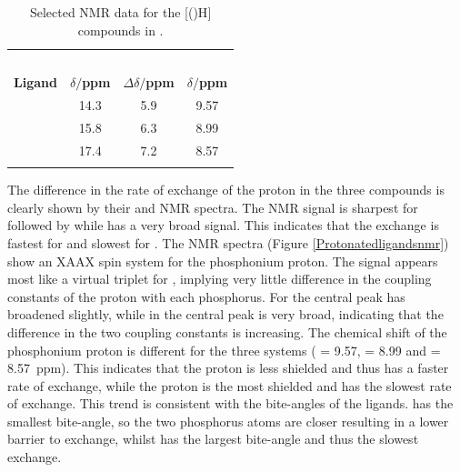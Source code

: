 \begin{table}[htbp]
\caption[Selected NMR data for [(\tBuxantphos)H{]}]{Selected NMR data for the [(\tBuxantphos)H{]} compounds in .}
\label{table:protonatedNMR}
\small
\begin{center}
\begin{tabular}{l c c c}
	\toprule{}
	~~ & \multicolumn{2}{c}{\bfseries{\phosphorus}} & \bfseries{\proton}\\
	\cmidrule(lr){2-3} \cmidrule(lr){4-4}
	\bfseries{Ligand}&\bfseries{$\delta/$ppm}&\bfseries{$\Delta\delta/$ppm}& \bfseries{\ce{H+}$\delta/$ppm}\\
	\midrule
	\tBuSixantphos		& 14.3	& 5.9 	& 9.57 \\
	\tBuThixantphos 	& 15.8	& 6.3		& 8.99 \\
	\tBuXantphos		& 17.4	& 7.2		& 8.57 \\
	\bottomrule{}
\end{tabular}
\end{center}
\end{table}

The difference in the rate of exchange of the proton in the three compounds is clearly shown by their \phosphorus{} and \proton{} NMR spectra.  The \phosphorus{} NMR signal is sharpest for \tBusixantphos{} followed by \tButhixantphos{} while \tBuxantphos{} has a very broad signal.  This indicates that the exchange is fastest for \tBusixantphos{} and slowest for \tBuxantphos{}.  The \proton{} NMR spectra (Figure \ref{Protonatedligandsnmr}) show an XAA\textprime{}X\textprime{} spin system for the phosphonium proton.  The signal appears most like a virtual triplet for \tBusixantphos{}, implying very little difference in the coupling constants of the proton with each phosphorus.  For \tButhixantphos{} the central peak has broadened slightly, while in \tBuxantphos{} the central peak is very broad, indicating that the difference in the two coupling constants is increasing.  The chemical shift of the phosphonium proton is different  for the three systems (\tBusixantphos{} = 9.57, \tButhixantphos{} = 8.99 and \tBuxantphos{} = 8.57~ppm).  This indicates that the \tBusixantphos{} proton is less shielded and thus has a faster rate of exchange, while the \tBuxantphos{} proton is the most shielded and has the slowest rate of exchange.  This trend is consistent with the bite-angles of the ligands.  \tBuSixantphos{} has the smallest bite-angle, so the two phosphorus atoms are closer resulting in a lower barrier to exchange, whilst \tBuxantphos{} has the largest bite-angle and thus the slowest exchange.  

